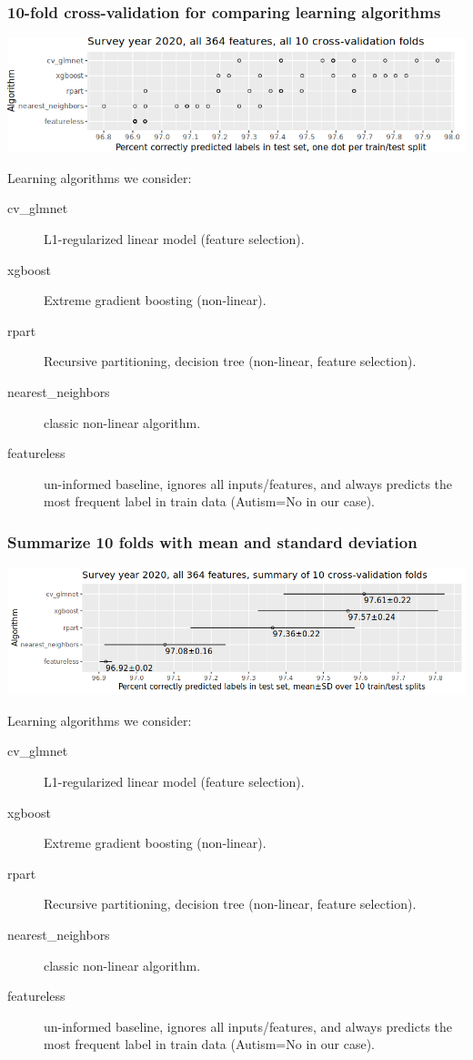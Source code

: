 \documentclass{beamer}
\begin{document}
\begin{frame}
  \frametitle{10-fold cross-validation for comparing learning algorithms}
  \includegraphics[width=\textwidth]{download-nsch-mlr3batchmark-registry-one-set-all-features.png}

  Learning algorithms we consider:
\begin{description}
\item[cv\_glmnet] L1-regularized linear model (feature selection).
\item[xgboost] Extreme gradient boosting (non-linear).
\item[rpart] Recursive partitioning, decision tree (non-linear, feature selection).
\item[nearest\_neighbors] classic non-linear algorithm.
\item[featureless] un-informed baseline, ignores all inputs/features,
  and always predicts the most frequent label in train data (Autism=No
  in our case).
\end{description}

\end{frame}

\begin{frame}
  \frametitle{Summarize 10 folds with mean and standard deviation}
  \includegraphics[width=\textwidth]{download-nsch-mlr3batchmark-registry-one-set-all-features-stats.png}

Learning algorithms we consider:
\begin{description}
\item[cv\_glmnet] L1-regularized linear model (feature selection).
\item[xgboost] Extreme gradient boosting (non-linear).
\item[rpart] Recursive partitioning, decision tree (non-linear, feature selection).
\item[nearest\_neighbors] classic non-linear algorithm.
\item[featureless] un-informed baseline, ignores all inputs/features,
  and always predicts the most frequent label in train data (Autism=No
  in our case).
\end{description}

\end{frame}
\end{document}
